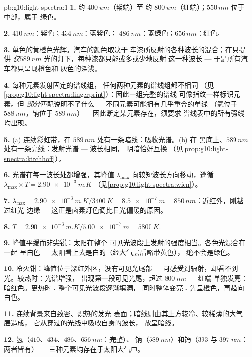 \begin{solution}{pb:g10:light-spectra:1}
\textbf{1.} 约 $\qty{400}{nm}$（紫端）至
约 $\qty{800}{nm}$（红端）；$\qty{550}{nm}$ 位于中部，属于
绿色。

\textbf{2.} $\qty{410}{nm}$：紫色；$\qty{434}{nm}$：蓝紫色；
$\qty{486}{nm}$：蓝绿色；$\qty{656}{nm}$：红色。

\textbf{3.} 单色的黄橙色光辉。汽车的颜色取决于
车漆所反射的各种波长的混合；在只提供
\emph{仅}$\qty{589}{nm}$ 光的灯下，每种漆都只能或多或少地反射
这一种波长 --- 于是所有汽车都只呈现橙色和
灰色的深浅。

\textbf{4.} 每种元素发射固定的谱线组，
任何两种元素的谱线组都不相同
（见\cref{prop:g10:light-spectra:fingerprint}）：因此一组完整的谱线
可像指纹一样标识元素。但
\emph{部分}匹配说明不了什么 --- 不同元素可能拥有几乎重合的单线
（氦位于 $\qty{588}{nm}$，钠位于
$\qty{589}{nm}$）--- 因此断定某元素存在，须要求
谱线表中的所有强线均出现。

\textbf{5.} (a) 连续彩虹带，在
$\qty{589}{nm}$ 处有一条暗线：吸收光谱。(b) 在
黑底上、$\qty{589}{nm}$ 处有一条亮线：发射光谱 --- 波长相同，
明暗恰好互换
（见\cref{prop:g10:light-spectra:kirchhoff}）。

\textbf{6.} 光谱在每一波长处都增强，其峰值
$\lambda_{\max}$ 向较短波长方向移动，遵循
$\lambda_{\max} \times T = \qty{2.90e-3}{m.K}$
（见\cref{prop:g10:light-spectra:wien}）。

\textbf{7.} $\lambda_{\max} = \qty{2.90e-3}{m.K} / \qty{3400}{K}
= \qty{8.5e-7}{m} = \qty{850}{nm}$：近红外，刚越过红光
边缘 --- 这正是卤素灯色调比日光偏暖的原因。

\textbf{8.} $T = \qty{2.90e-3}{m.K} / \qty{5.00e-7}{m} = \qty{5800}{K}$.

\textbf{9.} 峰值平缓而非尖锐：太阳在整个
可见光波段上发射的强度相当。各色光混合在一起
呈白色 --- 太阳看上去是白的（经大气层后略带黄色），
绝不会是绿色。

\textbf{10.} 冷火钳：峰值位于深红外区，没有可见光尾部 ---
可感受到辐射，却看不到光。较热时：光谱增强，
出现第一段可见光尾，超过 $\qty{800}{nm}$ --- 红端
单独发亮：暗红色。更热时：整个可见光波段逐渐填满，
同时整体变亮：先呈橙色，再趋向白色。

\textbf{11.} 连续背景来自致密、炽热的发光
表面；暗线则由其上方较冷、较稀薄的大气层造成，
它从穿过的光线中吸收自身的波长，
故呈暗线。

\textbf{12.} 氢（$410$、$434$、$486$、$\qty{656}{nm}$：完整）、
钠（$\qty{589}{nm}$）和钙（$393$ 与 $\qty{397}{nm}$：两者皆有）
--- 三种元素均存在于太阳大气中。


\end{solution}
